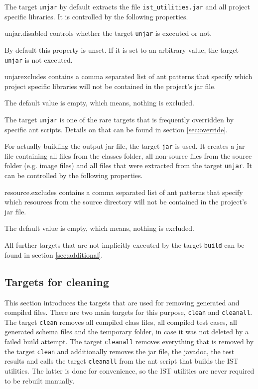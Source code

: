 \documentclass[a4paper,twoside,11pt,bibtotoc]{article}
\begin{document}
The target \texttt{unjar} by default extracts the file \texttt{ist\_utilities.jar} and all project specific libraries.
It is controlled by the following properties.
\begin{description*}
	\item[unjar.disabled] controls whether the target \texttt{unjar} is executed or not.\par By default this property is unset. If it is set to an arbitrary value, the target \texttt{unjar} is not executed.
	\item[unjarexcludes] contains a comma separated list of ant patterns that specify which project specific libraries will not be contained in the project's jar file.\par The default value is empty, which means, nothing is excluded.
\end{description*}

The target \texttt{unjar} is one of the rare targets that is frequently overridden by specific ant scripts.
Details on that can be found in section \ref{sec:override}.

For actually building the output jar file, the target \texttt{jar} is used.
It creates a jar file containing all files from the classes folder, all non-source files from the source folder (e.g. image files) and all files that were extracted from the target \texttt{unjar}.
It can be controlled by the following properties.

\begin{description*}
	\item[resource.excludes] contains a comma separated list of ant patterns that specify which resources from the source directory will not be contained in the project's jar file.\par The default value is empty, which means, nothing is excluded.
\end{description*}

All further targets that are not implicitly executed by the target \texttt{build} can be found in section \ref{sec:additional}.

\subsection{Targets for cleaning}
\label{sec:cleaning}
This section introduces the targets that are used for removing generated and compiled files.
There are two main targets for this purpose, \texttt{clean} and \texttt{cleanall}.
The target \texttt{clean} removes all compiled class files, all compiled test cases, all generated schema files and the temporary folder, in case it was not deleted by a failed build attempt.
The target \texttt{cleanall} removes everything that is removed by the target \texttt{clean} and additionally removes the jar file, the javadoc, the test results and calls the target \texttt{cleanall} from the ant script that builds the IST utilities.
The latter is done for convenience, so the IST utilities are never required to be rebuilt manually.
\end{document}
